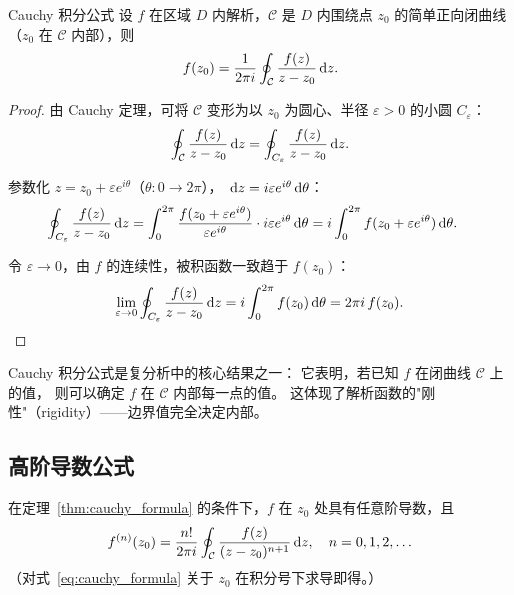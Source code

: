 \begin{theorem}{Cauchy 积分公式}{}
\label{thm:cauchy_formula}
设 $f$ 在区域 $D$ 内解析，$\mathcal{C}$ 是 $D$ 内围绕点 $z_0$
的简单正向闭曲线（$z_0$ 在 $\mathcal{C}$ 内部），则
\begin{equation}
    f(z_0) = \frac{1}{2\pi i}\oint_{\mathcal{C}}\frac{f(z)}{z-z_0}\,\mathrm{d} z.
  \label{eq:cauchy_formula}
\end{equation}
\end{theorem}

\begin{proof}
由 Cauchy 定理，可将 $\mathcal{C}$ 变形为以 $z_0$ 为圆心、半径 $\varepsilon>0$ 的小圆 $C_\varepsilon$：
\begin{equation}
  \oint_{\mathcal{C}}\frac{f(z)}{z-z_0}\,\mathrm{d} z
  = \oint_{C_\varepsilon}\frac{f(z)}{z-z_0}\,\mathrm{d} z.
  \label{eq:CF_step1}
\end{equation}

参数化 $z=z_0+\varepsilon e^{i\theta}$（$\theta:0\to2\pi$），
$\,\mathrm{d} z=i\varepsilon e^{i\theta}\,\mathrm{d}\theta$：
\begin{align}
  \oint_{C_\varepsilon}\frac{f(z)}{z-z_0}\,\mathrm{d} z
  &= \int_0^{2\pi}\frac{f(z_0+\varepsilon e^{i\theta})}{\varepsilon e^{i\theta}}
     \cdot i\varepsilon e^{i\theta}\,\mathrm{d}\theta
  = i\int_0^{2\pi} f(z_0+\varepsilon e^{i\theta})\,\mathrm{d}\theta.
  \label{eq:CF_step2}
\end{align}

令 $\varepsilon\to0$，由 $f$ 的连续性，被积函数一致趋于 $f(z_0)$：
\begin{equation}
  \lim_{\varepsilon\to0}\oint_{C_\varepsilon}\frac{f(z)}{z-z_0}\,\mathrm{d} z
  = i\int_0^{2\pi}f(z_0)\,\mathrm{d}\theta = 2\pi i\,f(z_0). \qedhere
\end{equation}
\end{proof}


Cauchy 积分公式是复分析中的核心结果之一：
它表明，若已知 $f$ 在闭曲线 $\mathcal{C}$ 上的值，
则可以确定 $f$ 在 $\mathcal{C}$ 内部每一点的值。
这体现了解析函数的"刚性"（rigidity）——边界值完全决定内部。


\subsection{高阶导数公式}

\label{thm:cauchy_higher}
在定理~\ref{thm:cauchy_formula} 的条件下，$f$ 在 $z_0$ 处具有任意阶导数，且
\begin{equation}
    f^{(n)}(z_0) = \frac{n!}{2\pi i}\oint_{\mathcal{C}}\frac{f(z)}{(z-z_0)^{n+1}}\,\mathrm{d} z,
    \quad n=0,1,2,\ldots
  \label{eq:cauchy_higher}
\end{equation}
（对式~\eqref{eq:cauchy_formula} 关于 $z_0$ 在积分号下求导即得。）

